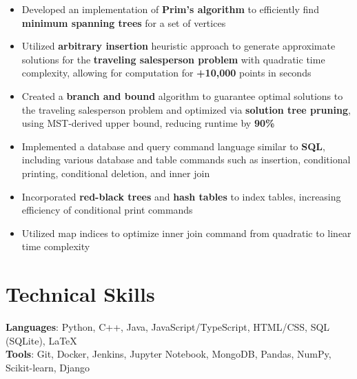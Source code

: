 \documentclass[letterpaper,11pt]{article}
\begin{document}
\begin{itemize}[leftmargin=*]
    \item \vspace{-3pt} \small Developed an implementation of \textbf{Prim's algorithm}
          to efficiently find \textbf{minimum spanning trees} for a set of vertices
    \item \vspace{-7pt} \small Utilized \textbf{arbitrary insertion} heuristic approach
          to generate approximate solutions for the \textbf{traveling salesperson
              problem} with quadratic time complexity,
          allowing for computation for \textbf{+10,000} points in seconds
    \item \vspace{-7pt} \small Created a \textbf{branch and bound} algorithm to
          guarantee optimal solutions to the traveling salesperson problem and
          optimized via \textbf{solution tree pruning}, using MST-derived upper bound,
          reducing runtime by \textbf{90\%}
\end{itemize}
\begin{itemize}[leftmargin=*]
    \item \vspace{-3pt} \small Implemented a database and query command
          language similar to \textbf{SQL}, including various database and table commands
          such as insertion, conditional printing, conditional deletion, and
          inner join
    \item \vspace{-7pt} \small Incorporated \textbf{red-black trees} and
          \textbf{hash tables}
          to index tables, increasing efficiency of conditional print commands
    \item \vspace{-7pt} \small Utilized map indices to optimize inner join
          command from quadratic to linear time complexity
\end{itemize}
\section{Technical Skills}
\textbf{Languages}: Python, C++, Java, JavaScript/TypeScript, HTML/CSS, SQL
(SQLite), \LaTeX \\
\textbf{Tools}: Git, Docker, Jenkins, Jupyter Notebook,
MongoDB, Pandas, NumPy, Scikit-learn, Django
\end{document}
